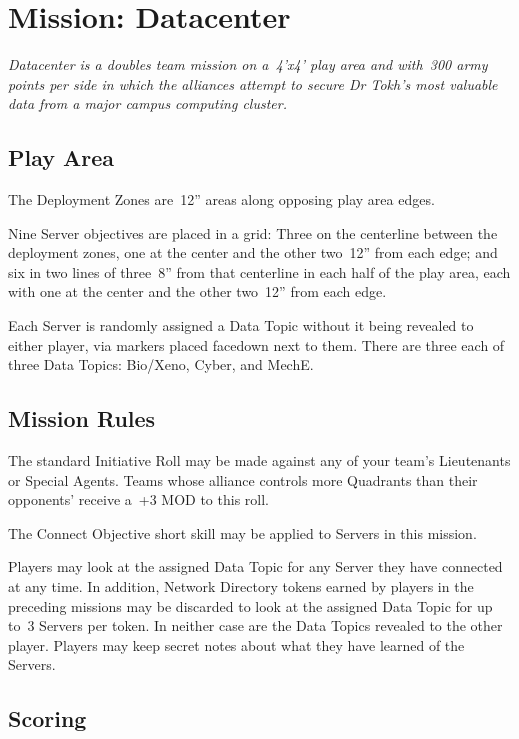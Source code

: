\chapter{Mission: Datacenter}

\emph{\emph{Datacenter} is a doubles team mission on a~4'x4' play area
  and with~300 army points per side in which the alliances attempt to
  secure Dr Tokh's most valuable data from a major campus computing
  cluster.}

\section{Play Area}

The Deployment Zones are~12'' areas along opposing play area edges.

Nine Server objectives are placed in a grid: Three on the centerline
between the deployment zones, one at the center and the other two~12''
from each edge; and six in two lines of three~8'' from that centerline
in each half of the play area, each with one at the center and the
other two~12'' from each edge.

Each Server is randomly assigned a Data Topic without it being
revealed to either player, via markers placed facedown next to them.
There are three each of three Data Topics: Bio/Xeno, Cyber, and MechE.

\section{Mission Rules}

The standard Initiative Roll may be made against any of your team's
Lieutenants or Special Agents.  Teams whose alliance controls more
Quadrants than their opponents' receive a~+3 MOD to this roll.


The Connect Objective short skill may be applied to Servers in this
mission.

Players may look at the assigned Data Topic for any Server they have
connected at any time.  In addition, Network Directory tokens earned
by players in the preceding missions may be discarded to look at the
assigned Data Topic for up to~3 Servers per token.  In neither case
are the Data Topics revealed to the other player.  Players may keep
secret notes about what they have learned of the Servers.


\section{Scoring}

